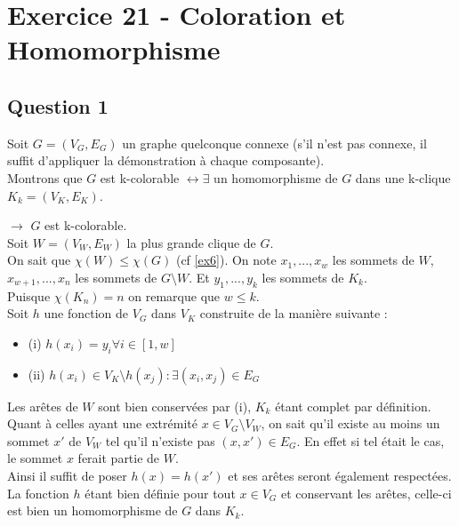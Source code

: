 
\section{Exercice 21 - Coloration et Homomorphisme}\label{ex21}

\subsection{Question 1}\label{ex21_q1}
Soit $G = (V_G,E_G)$ un graphe quelconque connexe (s'il n'est pas connexe, il suffit
d'appliquer la d\'emonstration \`a chaque composante).\\
Montrons que $G$ est k-colorable $\leftrightarrow \exists$ un homomorphisme de $G$
dans une k-clique $K_k = (V_K,E_K)$.

$\rightarrow$ $G$ est k-colorable.\\
Soit $W = (V_W,E_W)$ la plus grande clique de $G$.\\
On sait que $\chi(W) \leq \chi(G)$ (cf \ref{ex6}).
On note $x_1,...,x_w$ les sommets de $W$, $x_{w+1},...,x_n$ les sommets de $G \setminus
W$.
Et $y_1,...,y_k$ les sommets de $K_k$.\\
Puisque $\chi(K_n) = n$ on remarque que $w \leq k$.\\
Soit $h$ une fonction de $V_G$ dans $V_K$ construite de la mani\`ere suivante :
\begin{itemize}
	\item (i)  $h(x_i) = y_i \forall i \in [1,w]$
	\item (ii) $h(x_i) \in V_K \setminus {h(x_j) : \exists (x_i,x_j) \in E_G}$
\end{itemize}
Les ar\^etes de $W$ sont bien conserv\'ees par (i), $K_k$ \'etant complet par d\'efinition.
Quant \`a celles ayant une extr\'emit\'e $x \in V_G \setminus V_W$, on sait qu'il existe
au moins un sommet $x'$ de $V_W$ tel qu'il n'existe pas $(x,x') \in E_G$. En effet si tel
\'etait le cas, le sommet $x$ ferait partie de $W$.\\
Ainsi il suffit de poser $h(x) = h(x')$ et ses ar\^etes seront \'egalement
respect\'ees.\\
La fonction $h$ \'etant bien d\'efinie pour tout $x \in V_G$ et conservant les ar\^etes,
celle-ci est bien un homomorphisme de $G$ dans $K_k$.

